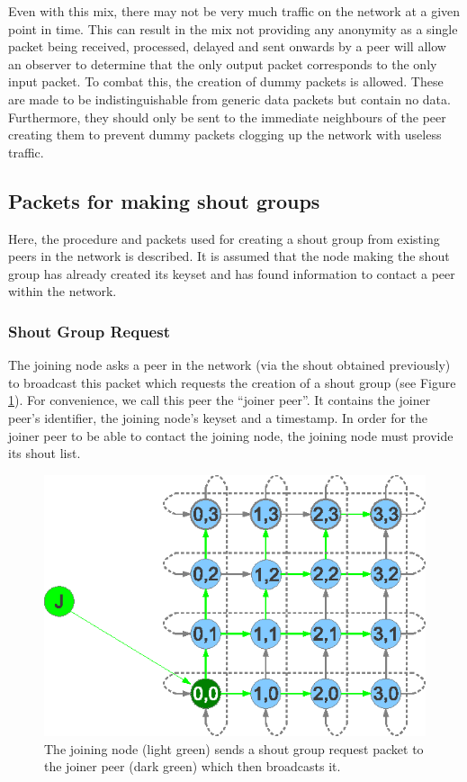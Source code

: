 \documentclass[ %
                    author={Luke Murray},
                supervisor={Dr. Simon Hollis},
                     title={Shadow Peer-to-Peer Networks},
                  subtitle={},
                    degree={MEng},
                      year={2013} ]{thesis}
\begin{document}
Even with this mix, there may not be very much traffic on the network at a given point in time. This can result in the mix not providing any anonymity as a single packet being received, processed, delayed and sent onwards by a peer will allow an observer to determine that the only output packet corresponds to the only input packet. To combat this, the creation of dummy packets is allowed. These are made to be indistinguishable from generic data packets but contain no data. Furthermore, they should only be sent to the immediate neighbours of the peer creating them to prevent dummy packets clogging up the network with useless traffic.

\subsection{Packets for making shout groups}
\label{sec:create_shout_group}

Here, the procedure and packets used for creating a shout group from existing peers in the network is described. It is assumed that the node making the shout group has already created its keyset and has found information to contact a peer within the network.

\subsubsection{Shout Group Request}

The joining node asks a peer in the network (via the shout obtained previously) to broadcast this packet which requests the creation of a shout group (see Figure \ref{create_shout_group}). For convenience, we call this peer the ``joiner peer''. It contains the joiner peer's identifier, the joining node's keyset and a timestamp. In order for the joiner peer to be able to contact the joining node, the joining node must provide its shout list.

\begin{figure}[h]
    \centering
    \includegraphics{diagrams/create_shout_group.eps}
    \caption{The joining node (light green) sends a shout group request packet to the joiner peer (dark green) which then broadcasts it.}
    \label{create_shout_group}
\end{figure}
\end{document}
